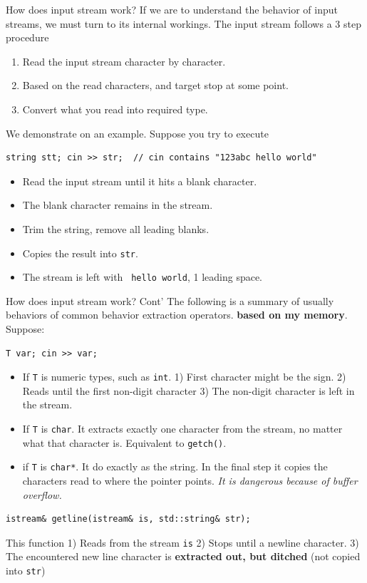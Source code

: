 \begin{frame}[fragile]{How does input stream work?}
If we are to understand the behavior of input streams, we must turn to its internal workings. The input stream follows a 3 step procedure
\begin{enumerate}
\item Read the input stream character by character.
\item Based on the read characters, and target stop at some point.
\item Convert what you read into required type.
\end{enumerate}
We demonstrate on an example. Suppose you try to execute 

\begin{verbatim}
string stt; cin >> str;  // cin contains "123abc hello world"
\end{verbatim}

\begin{itemize}
\item Read the input stream until it hits a blank character.
\item The blank character remains in the stream. 
\item Trim the string, remove all leading blanks.
\item Copies the result into \texttt{str}.
\item The stream is left with \texttt{ hello world}, 1 leading space.
\end{itemize}
\end{frame}

\begin{frame}[fragile]{How does input stream work? Cont'}
The following is a summary of usually behaviors of common behavior extraction operators. \textbf{based on my memory}. Suppose:
\begin{verbatim}
T var; cin >> var;
\end{verbatim}
\begin{itemize}
\item If \texttt{T} is numeric types, such as \texttt{int}. 1) First character might be the sign. 2) Reads until the first non-digit character 3) The non-digit character is left in the stream. 
\item If \texttt{T} is \texttt{char}. It extracts exactly one character from the stream, no matter what that character is. Equivalent to \texttt{getch()}.
\item if \texttt{T} is \texttt{char*}. It do exactly as the string. In the final step it copies the characters read to where the pointer points. \textit{It is dangerous because of buffer overflow.}
\end{itemize}

\begin{verbatim}
istream& getline(istream& is, std::string& str);
\end{verbatim}

This function 1) Reads from the stream \texttt{is} 2) Stops until a newline character. 3) The encountered new line character is \textbf{extracted out, but ditched} (not copied into \texttt{str}) 
\end{frame}

